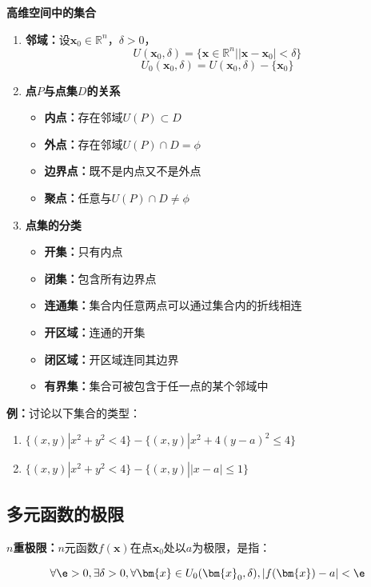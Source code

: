\begin{shaded}
	{\bf 高维空间中的集合}
	
	\begin{enumerate}
	  \item {\bf 邻域：}设$\bm{x}_0\in\mathbb{R}^n$，$\delta>0$，
	  $$U(\bm{x}_0,\delta)=\{\bm{x}\in\mathbb{R}^n||\bm{x}-\bm{x}_0|<\delta\}$$
	  $$U_0(\bm{x}_0,\delta)=U(\bm{x}_0,\delta)-\{\bm{x}_0\}$$
	  \item {\bf 点$P$与点集$D$的关系}
	  \begin{itemize}
	    \item {\bf 内点：}存在邻域$U(P)\subset D$
	    \item {\bf 外点：}存在邻域$U(P)\cap D=\phi$
	    \item {\bf 边界点：}既不是内点又不是外点
	    \item {\bf 聚点：}任意与$U(P)\cap D\ne\phi$
	  \end{itemize}
	  \item {\bf 点集的分类}
	  \begin{itemize}
	    \item {\bf 开集：}只有内点 
	  	\item {\bf 闭集：}包含所有边界点 
	  	\item {\bf 连通集：}集合内任意两点可以通过集合内的折线相连 
	  	\item {\bf 开区域：}连通的开集 
	  	\item {\bf 闭区域：}开区域连同其边界 
	  	\item {\bf 有界集：}集合可被包含于任一点的某个邻域中
	  \end{itemize}
	\end{enumerate}
	
	{\bf 例：}讨论以下集合的类型：
	\begin{enumerate}[(1)]
  	  \setlength{\itemindent}{1cm}
	  \item $\{(x,y)|x^2+y^2<4\}-\{(x,y)|x^2+4(y-a)^2\leq 4\}$
	  \item $\{(x,y)|x^2+y^2<4\}-\{(x,y)||x-a|\leq 1\}$
	\end{enumerate}
\end{shaded}

\subsection{多元函数的极限}

{\bf $n$重极限：}$n$元函数$f(\bm{x})$在点$\bm{x}_0$处以$a$为极限，是指：

$$\forall\e>0,\exists\delta>0,\forall \bm{x}\in U_0(\bm{x}_0,\delta),
|f(\bm{x})-a|<\e $$

